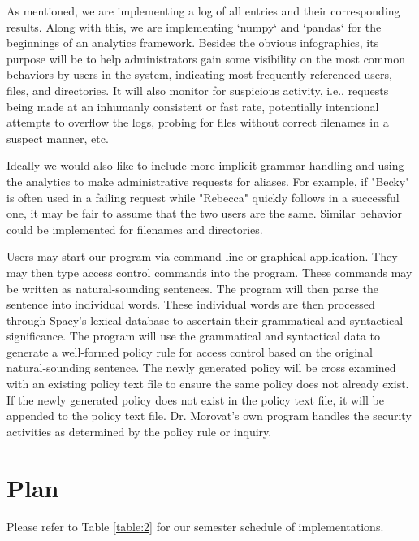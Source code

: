 \documentclass[12pt]{article}
\begin{document}
As mentioned, we are implementing a log of all entries and their corresponding results. Along with this, we are implementing `numpy` and `pandas` for the beginnings of an analytics framework. Besides the obvious infographics, its purpose will be to help administrators gain some visibility on the most common behaviors by users in the system, indicating most frequently referenced users, files, and directories. It will also monitor for suspicious activity, i.e., requests being made at an inhumanly consistent or fast rate, potentially intentional attempts to overflow the logs, probing for files without correct filenames in a suspect manner, etc.

Ideally we would also like to include more implicit grammar handling and using the analytics to make administrative requests for aliases. For example, if "Becky" is often used in a failing request while "Rebecca" quickly follows in a successful one, it may be fair to assume that the two users are the same. Similar behavior could be implemented for filenames and directories.

Users may start our program via command line or graphical application. They may then type access control commands into the program. These commands may be written as natural-sounding sentences. The program will then parse the sentence into individual words. These individual words are then processed through Spacy's lexical database to ascertain their grammatical and syntactical significance. The program will use the grammatical and syntactical data to generate a well-formed policy rule for access control based on the original natural-sounding sentence. The newly generated policy will be cross examined with an existing policy text file to ensure the same policy does not already exist. If the newly generated policy does not exist in the policy text file, it will be appended to the policy text file. Dr. Morovat’s own program handles the security activities as determined by the policy rule or inquiry.

\section{Plan}

Please refer to Table \ref{table:2} for our semester schedule of implementations.
\end{document}

